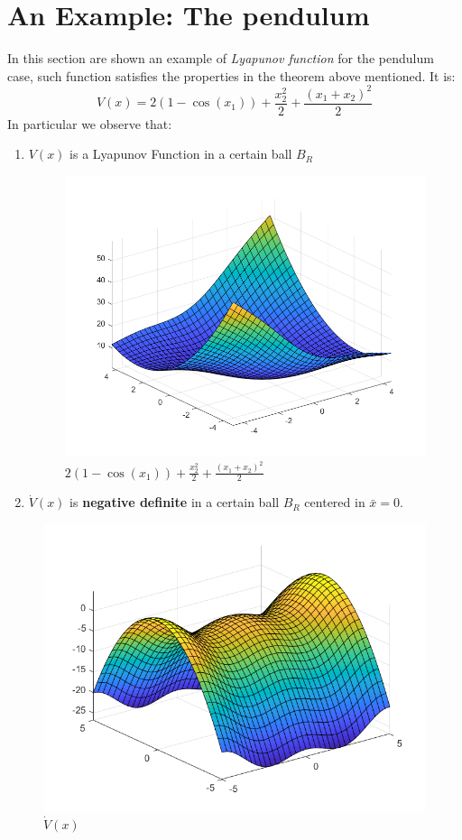 \section {An Example: The pendulum}
In this section are shown an example of \textit{Lyapunov function} for the pendulum case, such function satisfies the properties in the theorem above mentioned. It is: 
\begin{equation*}
    V(x)=2(1-\cos(x_1))+\frac{x_2^2}{2}+\frac{(x_1+x_2)^2}{2}
\end{equation*}
In particular we observe that: 
\begin{enumerate}
    \item $V(x)$ is a Lyapunov Function in a certain ball $B_R$
    \begin{figure}[h]
    \centering
    \includegraphics[scale=0.6]{NonLinearControl/images/Lyapunov.png}
    \caption{$2(1-\cos(x_1))+\frac{x_2^2}{2}+\frac{(x_1+x_2)^2}{2}$}
    \label{fig:enter-label}
    \end{figure}
    \item $\dot{V}(x)$ is \textbf{negative definite} in a certain ball $B_R$ centered in $\bar{x}=0$.  
\end{enumerate}

\begin{figure}[h]
    \centering
    \includegraphics[scale=0.7]{NonLinearControl/images/Lyap_Der.png}
    \caption{$\dot{V}(x)$}
    \label{fig:enter-label}
\end{figure}
